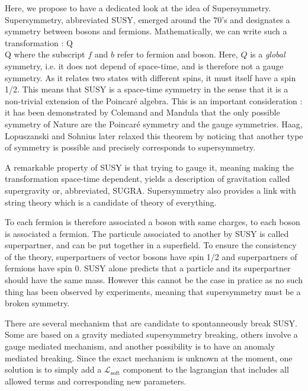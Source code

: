         Here, we propose to have a dedicated look at the idea of Supersymmetry. Supersymmetry,
        abbreviated SUSY, emerged around the 70's and designates a symmetry between bosons
        and fermions. Mathematically, we can write such a transformation :
        {
            Q \rvert {} \rangle \rightarrow \rvert {} \rangle \nonumber
            \\
            Q \rvert {} \rangle \rightarrow \rvert {} \rangle
        }
        where the subscript $f$ and $b$ refer to fermion and boson. Here, $Q$ is a \emph{global}
        symmetry, i.e. it does not depend of space-time, and is therefore not a gauge
        symmetry. As it relates two states with different spins, it must itself have a
        spin 1/2. This means  that SUSY is a space-time symmetry
        in the sense that it is a non-trivial extension of the Poincaré algebra. This is
        an important consideration : it has been demonstrated by Colemand and Mandula  that
        the only possible symmetry of Nature are the Poincaré symmetry and the gauge
        symmetries. Haag, Lopuszanski and Sohnius later relaxed this theorem by
        noticing that another type of symmetry is possible and precisely corresponds to
        supersymmetry. 

        A remarkable property of SUSY is that trying to gauge it, meaning making the
        transformation space-time dependent, yields a description of gravitation called
        supergravity or, abbreviated, SUGRA. Supersymmetry also provides a link with
        string theory which is a candidate of theory of everything.

        To each fermion is therefore associated a boson with same charges, to each boson
        is associated a fermion. The particule associated to another by SUSY is called
        superpartner, and can be put together in a superfield. To ensure the consistency
        of the theory, superpartners of vector bosons have spin 1/2 and superpartners
        of fermions have spin 0.  SUSY alone predicts that a particle and its superpartner
        should have the same mass. However this cannot be the case in pratice as no
        such thing has been observed by experiments, meaning that supersymmetry must be
        a broken symmetry.

        There are several mechanism that are candidate to spontanneously break SUSY. Some
        are based on a gravity mediated supersymmetry breaking, others involve a gauge
        mediated mechanism, and another possibility is to have an anomaly mediated breaking.
        Since the exact mechanism is unknown at the moment, one solution is to simply add
        a $\mathcal{L}_\text{soft}$ component to the lagrangian that includes all allowed
        terms and corresponding new parameters.

